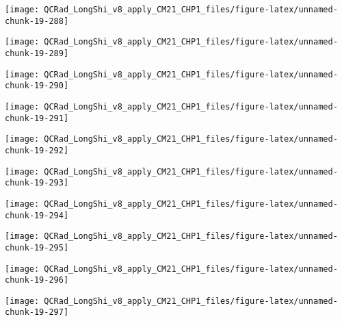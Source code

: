 \documentclass[
  10pt,
  a4paper,oneside]{article}
\begin{document}
\begin{center}\texttt{[image: QCRad\_LongShi\_v8\_apply\_CM21\_CHP1\_files/figure-latex/unnamed-chunk-19-288]} \end{center}

\begin{center}\texttt{[image: QCRad\_LongShi\_v8\_apply\_CM21\_CHP1\_files/figure-latex/unnamed-chunk-19-289]} \end{center}

\begin{center}\texttt{[image: QCRad\_LongShi\_v8\_apply\_CM21\_CHP1\_files/figure-latex/unnamed-chunk-19-290]} \end{center}

\begin{center}\texttt{[image: QCRad\_LongShi\_v8\_apply\_CM21\_CHP1\_files/figure-latex/unnamed-chunk-19-291]} \end{center}

\begin{center}\texttt{[image: QCRad\_LongShi\_v8\_apply\_CM21\_CHP1\_files/figure-latex/unnamed-chunk-19-292]} \end{center}

\begin{center}\texttt{[image: QCRad\_LongShi\_v8\_apply\_CM21\_CHP1\_files/figure-latex/unnamed-chunk-19-293]} \end{center}

\begin{center}\texttt{[image: QCRad\_LongShi\_v8\_apply\_CM21\_CHP1\_files/figure-latex/unnamed-chunk-19-294]} \end{center}

\begin{center}\texttt{[image: QCRad\_LongShi\_v8\_apply\_CM21\_CHP1\_files/figure-latex/unnamed-chunk-19-295]} \end{center}

\begin{center}\texttt{[image: QCRad\_LongShi\_v8\_apply\_CM21\_CHP1\_files/figure-latex/unnamed-chunk-19-296]} \end{center}

\begin{center}\texttt{[image: QCRad\_LongShi\_v8\_apply\_CM21\_CHP1\_files/figure-latex/unnamed-chunk-19-297]} \end{center}
\end{document}
